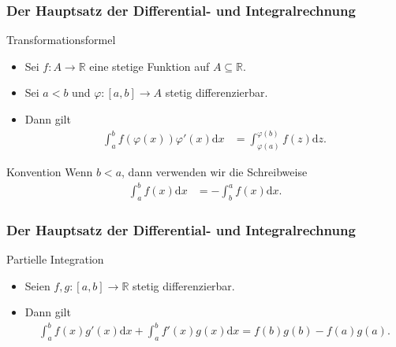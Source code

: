 \documentclass{beamer}
\newcommand\dd{\mathrm d}
\newcommand\RR{\mathbb R}
\newcommand{\mytitle}{Der Hauptsatz der Differential- und Integralrechnung}
\begin{document}
\begin{frame}\frametitle{\mytitle}
	\begin{block}{Transformationsformel}
	\begin{itemize}
	\item Sei $f:A\to\RR$ eine stetige Funktion auf $A\subseteq\RR$.
		\item Sei $a<b$ und $\varphi:[a,b]\to A$ stetig differenzierbar.
		\item Dann gilt
			\begin{align*}
				\int_a^b f(\varphi(x))\varphi'(x)\dd x&=\int_{\varphi(a)}^{\varphi(b)}f(z)\dd z.
			\end{align*}
	\end{itemize}
	\end{block}
	\begin{block}{Konvention}
	Wenn $b<a$, dann verwenden wir die Schreibweise	
		\begin{align*}
			\int_a^bf(x)\dd x&=-\int_b^a f(x)\dd x.
		\end{align*}
	\end{block}
\end{frame}

\begin{frame}\frametitle{\mytitle}
	\begin{block}{Partielle Integration}
	\begin{itemize}
		\item Seien $f,g:[a,b]\to\RR$ stetig differenzierbar.
		\item Dann gilt
			\begin{align*}
				\int_a^bf(x)g'(x)\dd x+\int_a^bf'(x)g(x)\dd x=f(b)g(b)-f(a)g(a).
			\end{align*}
	\end{itemize}
	\end{block}
\end{frame}
\end{document}
